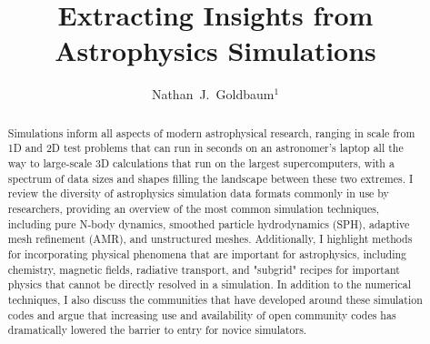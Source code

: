\documentclass[11pt,twoside]{article}
\begin{document}
\title{Extracting Insights from Astrophysics Simulations}

\author{Nathan~J.~Goldbaum$^1$}



\begin{abstract}
Simulations inform all aspects of modern astrophysical research, ranging in scale from 1D and 2D test problems that can run in seconds on an astronomer's laptop all the way to large-scale 3D calculations that run on the largest supercomputers, with a spectrum of data sizes and shapes filling the landscape between these two extremes. I review the diversity of astrophysics simulation data formats commonly in use by researchers, providing an overview of the most common simulation techniques, including pure N-body dynamics, smoothed particle hydrodynamics (SPH), adaptive mesh refinement (AMR), and unstructured meshes. Additionally, I highlight methods for incorporating physical phenomena that are important for astrophysics, including chemistry, magnetic fields, radiative transport, and "subgrid" recipes for important physics that cannot be directly resolved in a simulation. In addition to the numerical techniques, I also discuss the communities that have developed around these simulation codes and argue that increasing use and availability of open community codes has dramatically lowered the barrier to entry for novice simulators.
\end{abstract}
\end{document}
